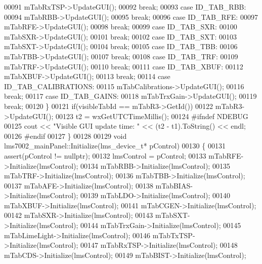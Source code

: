 \begin{DoxyCode}
00091         mTabRxTSP->UpdateGUI();
00092         \textcolor{keywordflow}{break};
00093     \textcolor{keywordflow}{case} ID_TAB_RBB:
00094         mTabRBB->UpdateGUI();
00095         \textcolor{keywordflow}{break};
00096     \textcolor{keywordflow}{case} ID_TAB_RFE:
00097         mTabRFE->UpdateGUI();
00098         \textcolor{keywordflow}{break};
00099     \textcolor{keywordflow}{case} ID_TAB_SXR:
00100         mTabSXR->UpdateGUI();
00101         \textcolor{keywordflow}{break};
00102     \textcolor{keywordflow}{case} ID_TAB_SXT:
00103         mTabSXT->UpdateGUI();
00104         \textcolor{keywordflow}{break};
00105     \textcolor{keywordflow}{case} ID_TAB_TBB:
00106         mTabTBB->UpdateGUI();
00107         \textcolor{keywordflow}{break};
00108     \textcolor{keywordflow}{case} ID_TAB_TRF:
00109         mTabTRF->UpdateGUI();
00110         \textcolor{keywordflow}{break};
00111     \textcolor{keywordflow}{case} ID_TAB_XBUF:
00112         mTabXBUF->UpdateGUI();
00113         \textcolor{keywordflow}{break};
00114     \textcolor{keywordflow}{case} ID_TAB_CALIBRATIONS:
00115         mTabCalibrations->UpdateGUI();
00116         \textcolor{keywordflow}{break};
00117     \textcolor{keywordflow}{case} ID_TAB_GAINS:
00118         mTabTrxGain->UpdateGUI();
00119         \textcolor{keywordflow}{break};
00120     \}
00121     \textcolor{keywordflow}{if}(visibleTabId == mTabR3->GetId())
00122         mTabR3->UpdateGUI();
00123     t2 = wxGetUTCTimeMillis();
00124 \textcolor{preprocessor}{#ifndef NDEBUG}
00125     cout << \textcolor{stringliteral}{"Visible GUI update time: "} << (t2 - t1).ToString() << endl;
00126 \textcolor{preprocessor}{#endif}
00127 \}
00128 
00129 \textcolor{keywordtype}{void} lms7002_mainPanel::Initialize(lms_device_t* pControl)
00130 \{
00131     assert(pControl != \textcolor{keyword}{nullptr});
00132     lmsControl = pControl;
00133     mTabRFE->Initialize(lmsControl);
00134     mTabRBB->Initialize(lmsControl);
00135     mTabTRF->Initialize(lmsControl);
00136     mTabTBB->Initialize(lmsControl);
00137     mTabAFE->Initialize(lmsControl);
00138     mTabBIAS->Initialize(lmsControl);
00139     mTabLDO->Initialize(lmsControl);
00140     mTabXBUF->Initialize(lmsControl);
00141     mTabCGEN->Initialize(lmsControl);
00142     mTabSXR->Initialize(lmsControl);
00143     mTabSXT->Initialize(lmsControl);
00144     mTabTrxGain->Initialize(lmsControl);
00145     mTabLimeLight->Initialize(lmsControl);
00146     mTabTxTSP->Initialize(lmsControl);
00147     mTabRxTSP->Initialize(lmsControl);
00148     mTabCDS->Initialize(lmsControl);
00149     mTabBIST->Initialize(lmsControl);

\end{DoxyCode}
